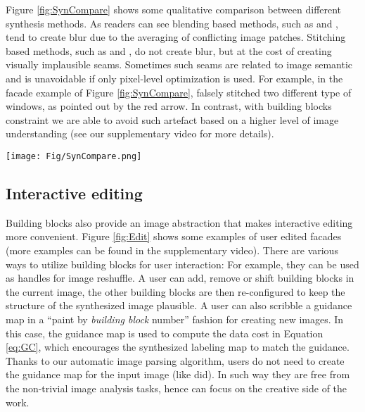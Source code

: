 \documentclass{acmtog}
\begin{document}
Figure \ref{fig:SynCompare} shows some qualitative comparison between different synthesis methods. As readers can see blending based methods, such as \cite{Kwatra2005TO} and \cite{Simakov2008SV}, tend to create blur due to the averaging of conflicting image patches. Stitching based methods, such as \cite{Pritch09ICCV} and \cite{He2012PO}, do not create blur, but at the cost of creating visually implausible seams. Sometimes such seams are related to image semantic and is unavoidable if only pixel-level optimization is used. For example, in the facade example of Figure \ref{fig:SynCompare}, \cite{He2012PO} falsely stitched two different type of windows, as pointed out by the red arrow. In contrast, with building blocks constraint we are able to avoid such artefact based on a higher level of image understanding (see our supplementary video for more details). 

\begin{figure*}
	\centering
		\texttt{[image: Fig/SynCompare.png]}
	\caption{Qualitative comparisons of image retargeting. For each example, we show the input image (top left), the results of \protect\cite{Kwatra2005TO} (top middle), \protect\cite{Simakov2008SV} (top right), \protect\cite{Pritch09ICCV} (bottom left), \protect\cite{He2012PO} (bottom middle) and our result (bottom right).}
	\label{fig:SynCompare} \vspace{-10pt}
\end{figure*}

\subsection{Interactive editing}

Building blocks also provide an image abstraction that makes interactive editing more convenient. Figure \ref{fig:Edit} shows some examples of user edited facades (more examples can be found in the supplementary video). There are various ways to utilize building blocks for user interaction: For example, they can be used as handles for image reshuffle. A user can add, remove or shift building blocks in the current image, the other building blocks are then re-configured to keep the structure of the synthesized image plausible. A user can also scribble a guidance map in a ``paint by \emph{building block} number'' fashion for creating new images. In this case, the guidance map is used to compute the data cost in Equation \ref{eq:GC}, which encourages the synthesized labeling map to match the guidance. Thanks to our automatic image parsing algorithm, users do not need to create the guidance map for the input image (like \cite{Hertzmann2001IA} did). In such way they are free from the non-trivial image analysis tasks, hence can focus on the creative side of the work. 
\end{document}
